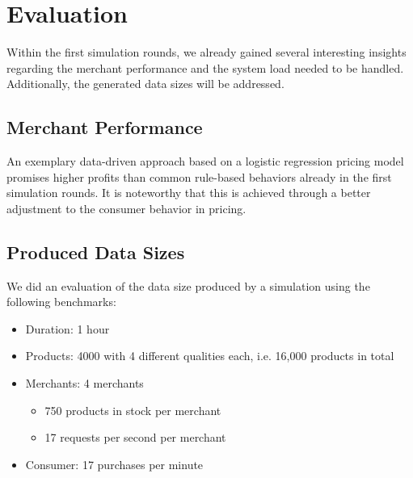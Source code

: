 %
\section{Evaluation}
\label{sec:evaluation}
%
Within the first simulation rounds, we already gained several interesting insights regarding the merchant performance and the system load needed to be handled. Additionally, the generated data sizes will be addressed.

\subsection{Merchant Performance}
\label{sec:merchant_evaluation}
%
An exemplary data-driven approach based on a logistic regression pricing model promises higher profits than common rule-based behaviors already in the first simulation rounds. It is noteworthy that this is achieved through a better adjustment to the consumer behavior in pricing.





%
\subsection{Produced Data Sizes}
%

We did an evaluation of the data size produced by a simulation using the following benchmarks:
\begin{itemize}
    \item Duration: 1 hour
    \item Products: 4000 with 4 different qualities each, i.e. 16,000 products in total
    \item Merchants: 4 merchants
    \begin{itemize}[nosep]
        \item 750 products in stock per merchant
        \item 17 requests per second per merchant
    \end{itemize}
    \item Consumer: 17 purchases per minute
\end{itemize}

